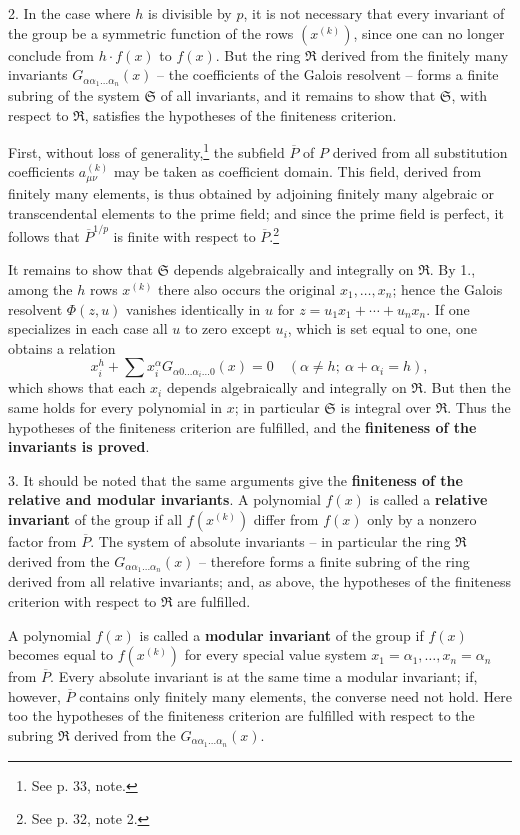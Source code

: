 \documentclass[11pt]{article}
\begin{document}
2. In the case where $h$ is divisible by $p$, it is not necessary that every invariant of the group be a symmetric function of the rows $(x^{(k)})$, since one can no longer conclude from $h\cdot f(x)$ to $f(x)$. But the ring $\mathfrak R$ derived from the finitely many invariants $G_{\alpha\alpha_1\ldots\alpha_n}(x)$ -- the coefficients of the Galois resolvent -- forms a finite subring of the system $\mathfrak S$ of all invariants, and it remains to show that $\mathfrak S$, with respect to $\mathfrak R$, satisfies the hypotheses of the finiteness criterion.

First, without loss of generality,\footnote{See p. 33, note.} the subfield $\overline P$ of $P$ derived from all substitution coefficients $a_{\mu\nu}^{(k)}$ may be taken as coefficient domain. This field, derived from finitely many elements, is thus obtained by adjoining finitely many algebraic or transcendental elements to the prime field; and since the prime field is perfect, it follows that $\overline P^{1/p}$ is finite with respect to $\overline P$.\footnote{See p. 32, note 2.}

It remains to show that $\mathfrak S$ depends algebraically and integrally on $\mathfrak R$. By 1., among the $h$ rows $x^{(k)}$ there also occurs the original $x_1,
\ldots,x_n$; hence the Galois resolvent $\Phi(z,u)$ vanishes identically in $u$ for $z=u_1x_1+\cdots+u_nx_n$. If one specializes in each case all $u$ to zero except $u_i$, which is set equal to one, one obtains a relation
\[
 x_i^h+\sum x_i^\alpha G_{\alpha0\ldots\alpha_i\ldots0}(x)=0
 \quad (\alpha\ne h;\ \alpha+\alpha_i=h),
\]
which shows that each $x_i$ depends algebraically and integrally on $\mathfrak R$. But then the same holds for every polynomial in $x$; in particular $\mathfrak S$ is integral over $\mathfrak R$. Thus the hypotheses of the finiteness criterion are fulfilled, and the \textbf{finiteness of the invariants is proved}.

3. It should be noted that the same arguments give the \textbf{finiteness of the relative and modular invariants}. A polynomial $f(x)$ is called a \textbf{relative invariant} of the group if all $f(x^{(k)})$ differ from $f(x)$ only by a nonzero factor from $\overline P$. The system of absolute invariants -- in particular the ring $\mathfrak R$ derived from the $G_{\alpha\alpha_1\ldots\alpha_n}(x)$ -- therefore forms a finite subring of the ring derived from all relative invariants; and, as above, the hypotheses of the finiteness criterion with respect to $\mathfrak R$ are fulfilled.

A polynomial $f(x)$ is called a \textbf{modular invariant} of the group if $f(x)$ becomes equal to $f(x^{(k)})$ for every special value system $x_1=\alpha_1,
\ldots,x_n=\alpha_n$ from $\overline P$. Every absolute invariant is at the same time a modular invariant; if, however, $\overline P$ contains only finitely many elements, the converse need not hold. Here too the hypotheses of the finiteness criterion are fulfilled with respect to the subring $\mathfrak R$ derived from the $G_{\alpha\alpha_1\ldots\alpha_n}(x)$.


\clearpage
\end{document}
